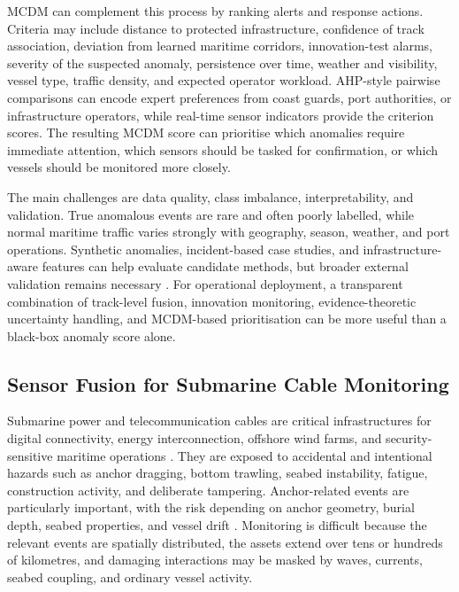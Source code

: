 \documentclass{ieeeaccess}
\begin{document}
MCDM can complement this process by ranking alerts and response actions. Criteria may include distance to protected infrastructure, confidence of track association, deviation from learned maritime corridors, innovation-test alarms, severity of the suspected anomaly, persistence over time, weather and visibility, vessel type, traffic density, and expected operator workload. AHP-style pairwise comparisons can encode expert preferences from coast guards, port authorities, or infrastructure operators, while real-time sensor indicators provide the criterion scores. The resulting MCDM score can prioritise which anomalies require immediate attention, which sensors should be tasked for confirmation, or which vessels should be monitored more closely.

The main challenges are data quality, class imbalance, interpretability, and validation. True anomalous events are rare and often poorly labelled, while normal maritime traffic varies strongly with geography, season, weather, and port operations. Synthetic anomalies, incident-based case studies, and infrastructure-aware features can help evaluate candidate methods, but broader external validation remains necessary \cite{oliva_tomei_prm_access_2026}. For operational deployment, a transparent combination of track-level fusion, innovation monitoring, evidence-theoretic uncertainty handling, and MCDM-based prioritisation can be more useful than a black-box anomaly score alone.

\subsection{Sensor Fusion for Submarine Cable Monitoring}

Submarine power and telecommunication cables are critical infrastructures for digital connectivity, energy interconnection, offshore wind farms, and security-sensitive maritime operations \cite{carter_submarine_2009,kavanagh_achieving_2025}. They are exposed to accidental and intentional hazards such as anchor dragging, bottom trawling, seabed instability, fatigue, construction activity, and deliberate tampering. Anchor-related events are particularly important, with the risk depending on anchor geometry, burial depth, seabed properties, and vessel drift \cite{yoon_safety_2013,osthoff_anchor_soil_2017,li_anchor_risk_2025}. Monitoring is difficult because the relevant events are spatially distributed, the assets extend over tens or hundreds of kilometres, and damaging interactions may be masked by waves, currents, seabed coupling, and ordinary vessel activity.
\end{document}
